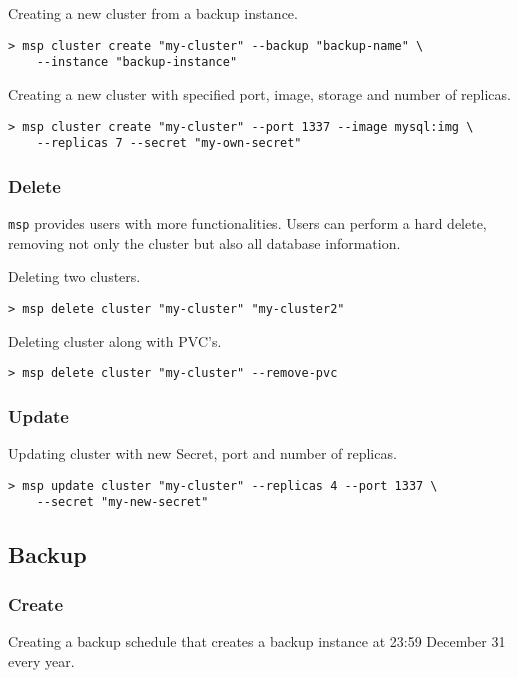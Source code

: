 \noindent Creating a new cluster from a backup instance.

\begin{lstlisting}
> msp cluster create "my-cluster" --backup "backup-name" \
	--instance "backup-instance"
\end{lstlisting}

\noindent Creating a new cluster with specified port, image, storage and number of replicas.

\begin{lstlisting}
> msp cluster create "my-cluster" --port 1337 --image mysql:img \
	--replicas 7 --secret "my-own-secret"
\end{lstlisting}

\subsubsection*{Delete}

\texttt{msp} provides users with more functionalities.  Users can perform a hard
delete, removing not only the cluster but also all database information.

\noindent Deleting two clusters.

\begin{lstlisting}
> msp delete cluster "my-cluster" "my-cluster2"
\end{lstlisting}

\noindent Deleting cluster along with PVC’s.

\begin{lstlisting}
> msp delete cluster "my-cluster" --remove-pvc
\end{lstlisting}

\subsubsection*{Update}
\noindent Updating cluster with new Secret, port and number of replicas.

\begin{lstlisting}
> msp update cluster "my-cluster" --replicas 4 --port 1337 \
	--secret "my-new-secret"
\end{lstlisting}

\subsection{Backup}

\subsubsection*{Create}
\noindent Creating a backup schedule that creates a backup instance at 23:59 December 31 every year.

